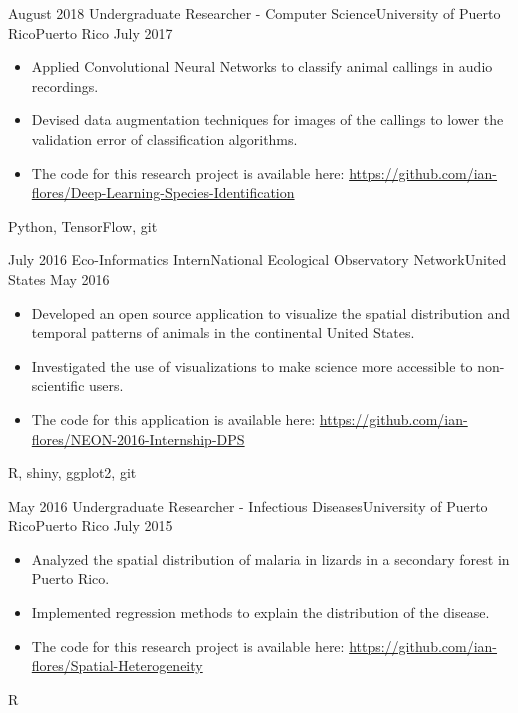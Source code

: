 \begin{experiences}
  \experience
    {August 2018}   {Undergraduate Researcher - Computer Science}{University of Puerto Rico}{Puerto Rico}
    {July 2017} {
                      \begin{itemize}
                        \item Applied Convolutional Neural Networks to classify animal callings in audio recordings.    
                        \item Devised data augmentation techniques for images of the callings to lower the validation \newline error of classification algorithms.
                        \item The code for this research project is available here: \newline
                        \href{https://github.com/ian-flores/Deep-Learning-Species-Identification}{https://github.com/ian-flores/Deep-Learning-Species-Identification}
                      \end{itemize}
                    }
                    {Python, TensorFlow, git}
  \emptySeparator
  
  \experience
    {July 2016}   {Eco-Informatics Intern}{National Ecological Observatory Network}{United States}
    {May 2016} {
                      \begin{itemize}
                        \item Developed an open source application to visualize the spatial distribution and temporal patterns of animals in the continental United States.
                        \item Investigated the use of visualizations to make science more accessible to non-scientific users.
                        \item The code for this application is available here: \newline
                        \href{https://github.com/ian-flores/NEON-2016-Internship-DPS}{https://github.com/ian-flores/NEON-2016-Internship-DPS}
                      \end{itemize}
                    }
                    {R, shiny, ggplot2, git}
  \emptySeparator
  
  \experience
    {May 2016}   {Undergraduate Researcher - Infectious Diseases}{University of Puerto Rico}{Puerto Rico}
    {July 2015} {
                      \begin{itemize}
                        \item Analyzed the spatial distribution of malaria in lizards in a secondary forest in Puerto Rico.
                        \item Implemented regression methods to explain the distribution of the disease.
                        \item The code for this research project is available here: \newline
                        \href{https://github.com/ian-flores/Spatial-Heterogeneity}{https://github.com/ian-flores/Spatial-Heterogeneity}
                     \end{itemize}
                    }
                    {R}
  \emptySeparator
  
\end{experiences}
